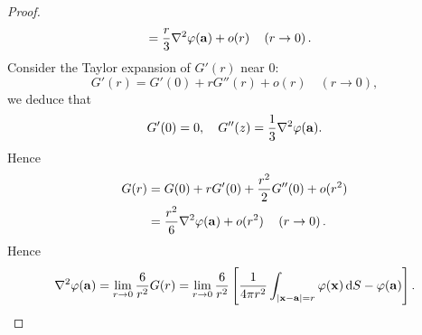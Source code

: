 \begin{proof}
\begin{align*}
        &= \frac{r}{3}\laplacian \varphi(\bfa)+o(r) \quad\left(r \to 0\right).
    \end{align*}
    Consider the Taylor expansion of $ G'(r) $ near 0:
    \[
        G'(r) = G'(0)+rG''(r)+o(r) \quad\left(r \to 0\right),
    \]
    we deduce that 
    \[
        G'(0)=0,\quad G''(z) = \frac{1}{3}\laplacian \varphi(\bfa).
    \]
    Hence 
    \begin{align*}
        G(r) &= G(0) + r G'(0) + \frac{r^2}{2}G''(0)+ o(r^2)\\ 
        &= \frac{r^2}{6}\laplacian \varphi(\bfa) + o(r^2) \quad\left(r \to 0\right).
    \end{align*}
    Hence 
    \[
        \laplacian\varphi(\bfa) = \lim_{r \to 0} \frac{6}{r^2}G(r)=\lim _{r \rightarrow 0} \frac{6}{r^{2}}\left[\frac{1}{4 \pi r^{2}} \int_{|\mathbf{x}-\mathbf{a}|=r} \varphi(\mathbf{x})\, \mathrm{d} S-\varphi(\mathbf{a})\right].\qedhere
    \]
\end{proof}

